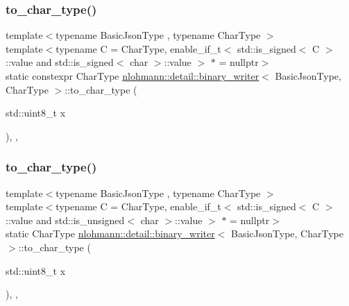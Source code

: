 \mbox{\label{classnlohmann_1_1detail_1_1binary__writer_ab77aa48692bd4e64e4f051ce6aeb6d2d}} 
\subsubsection{\texorpdfstring{to\+\_\+char\+\_\+type()}{to\_char\_type()}\hspace{0.1cm}{\footnotesize\ttfamily [1/4]}}
{\footnotesize\ttfamily template$<$typename Basic\+Json\+Type , typename Char\+Type $>$ \\
template$<$typename C  = Char\+Type, enable\+\_\+if\+\_\+t$<$ std\+::is\+\_\+signed$<$ C $>$\+::value and std\+::is\+\_\+signed$<$ char $>$\+::value $>$ $\ast$  = nullptr$>$ \\
static constexpr Char\+Type \hyperlink{classnlohmann_1_1detail_1_1binary__writer}{nlohmann\+::detail\+::binary\+\_\+writer}$<$ Basic\+Json\+Type, Char\+Type $>$\+::to\+\_\+char\+\_\+type (\begin{DoxyParamCaption}\item[{std\+::uint8\+\_\+t}]{x }\end{DoxyParamCaption})\hspace{0.3cm}{\ttfamily [inline]}, {\ttfamily [static]}, {\ttfamily [noexcept]}}

\mbox{\label{classnlohmann_1_1detail_1_1binary__writer_a5e46f0dd3550901b15cf85265808d1ec}} 
\subsubsection{\texorpdfstring{to\+\_\+char\+\_\+type()}{to\_char\_type()}\hspace{0.1cm}{\footnotesize\ttfamily [2/4]}}
{\footnotesize\ttfamily template$<$typename Basic\+Json\+Type , typename Char\+Type $>$ \\
template$<$typename C  = Char\+Type, enable\+\_\+if\+\_\+t$<$ std\+::is\+\_\+signed$<$ C $>$\+::value and std\+::is\+\_\+unsigned$<$ char $>$\+::value $>$ $\ast$  = nullptr$>$ \\
static Char\+Type \hyperlink{classnlohmann_1_1detail_1_1binary__writer}{nlohmann\+::detail\+::binary\+\_\+writer}$<$ Basic\+Json\+Type, Char\+Type $>$\+::to\+\_\+char\+\_\+type (\begin{DoxyParamCaption}\item[{std\+::uint8\+\_\+t}]{x }\end{DoxyParamCaption})\hspace{0.3cm}{\ttfamily [inline]}, {\ttfamily [static]}, {\ttfamily [noexcept]}}

